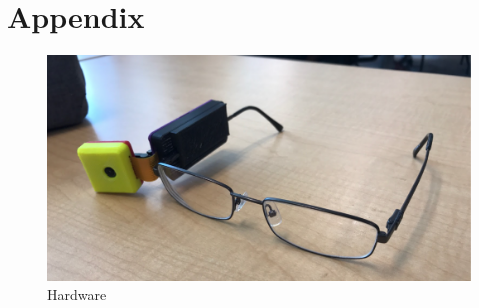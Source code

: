 \chapter{Appendix}

\begin{figure}
	\centering
	\includegraphics[scale = 0.6]{PRAHVI-HARDWARE}
	\caption{Hardware}
	\label{headsetPic}
\end{figure}


